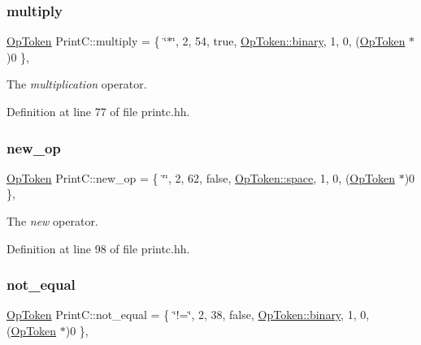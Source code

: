 \subsubsection{\texorpdfstring{multiply}{multiply}}
{\footnotesize\ttfamily \mbox{\hyperlink{class_op_token}{Op\+Token}} Print\+C\+::multiply = \{ \char`\"{}$\ast$\char`\"{}, 2, 54, true, \mbox{\hyperlink{class_op_token_af41c7f108d5662ede7765c5a6c44eaffa3a2ec63522a9329a71ddbe8adc3e752d}{Op\+Token\+::binary}}, 1, 0, (\mbox{\hyperlink{class_op_token}{Op\+Token}} $\ast$)0 \}\hspace{0.3cm}{\ttfamily [static]}, {\ttfamily [protected]}}



The {\itshape multiplication} operator. 



Definition at line 77 of file printc.\+hh.

\mbox{\label{class_print_c_af0b5719ea9e507609137db7749ef8aef}} 
\subsubsection{\texorpdfstring{new\_op}{new\_op}}
{\footnotesize\ttfamily \mbox{\hyperlink{class_op_token}{Op\+Token}} Print\+C\+::new\+\_\+op = \{ \char`\"{}\char`\"{}, 2, 62, false, \mbox{\hyperlink{class_op_token_af41c7f108d5662ede7765c5a6c44eaffa07bc235399849635f28ca7caaaebb1a4}{Op\+Token\+::space}}, 1, 0, (\mbox{\hyperlink{class_op_token}{Op\+Token}} $\ast$)0 \}\hspace{0.3cm}{\ttfamily [static]}, {\ttfamily [protected]}}



The {\itshape new} operator. 



Definition at line 98 of file printc.\+hh.

\mbox{\label{class_print_c_a115f90343fffd0f9bb3645b078fa98f8}} 
\subsubsection{\texorpdfstring{not\_equal}{not\_equal}}
{\footnotesize\ttfamily \mbox{\hyperlink{class_op_token}{Op\+Token}} Print\+C\+::not\+\_\+equal = \{ \char`\"{}!=\char`\"{}, 2, 38, false, \mbox{\hyperlink{class_op_token_af41c7f108d5662ede7765c5a6c44eaffa3a2ec63522a9329a71ddbe8adc3e752d}{Op\+Token\+::binary}}, 1, 0, (\mbox{\hyperlink{class_op_token}{Op\+Token}} $\ast$)0 \}\hspace{0.3cm}{\ttfamily [static]}, {\ttfamily [protected]}}



